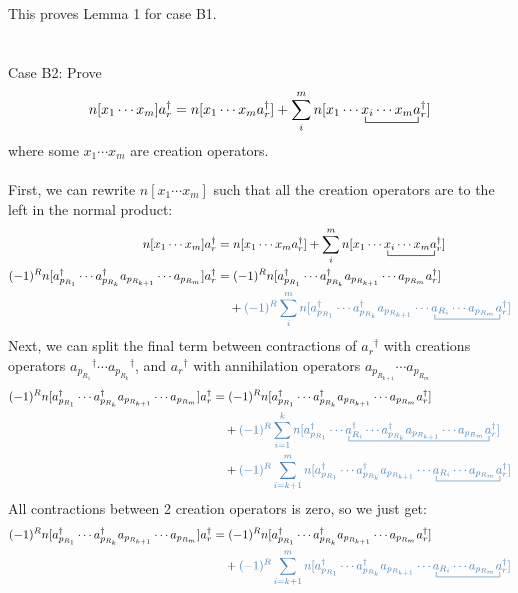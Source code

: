 \documentclass{article}
\newcommand{\ctr}{\bcontraction}
\newcommand{\dg}{\ensuremath{^\dagger} }
\newcommand{\cd}{\ensuremath{\cdots} }
\def\cb#1{{\color{blue}#1}}
\begin{document}
This proves Lemma 1 for case B1. 
\\ \\  \\ 
Case B2: Prove 
\[n[x_1 \cd x_m]a_r\dg = n[x_1 \cd x_m a_r\dg] + \sum_i^m n[\ctr{x_1 \cd}{x}{{}_i \cd x_m}{x} x_1 \cd x_i \cd x_m a_r\dg]\]
where some $x_1 \cd x_m$ are creation operators. \\ \\
First, we can rewrite $n[x_1 \cd x_m]$ such that all the creation operators are to the left in the normal product:
\begin{align*}
n[x_1 \cd x_m]a_r\dg &= n[x_1 \cd x_m a_r\dg] + \sum_i^m n[\ctr{x_1 \cd}{x}{{}_i \cd x_m}{x} x_1 \cd x_i \cd x_m a_r\dg] \\ 
(-1)^R n[a_{p_{R_1}}\dg \cd a_{p_{R_k}}\dg a_{p_{R_{k+1}}} \cd a_{p_{R_m}}] a_r\dg &= 
(-1)^R n[a_{p_{R_1}}\dg \cd a_{p_{R_k}}\dg a_{p_{R_{k+1}}} \cd a_{p_{R_m}} a_r\dg ]   \\
&\quad+ \cb{(-1)^R  \sum_i^m  n[\ctr{ a_{p_{R_1}}\dg \cd a_{p_{R_k}}\dg a_{p_{R_{k+1}}} \cd}{a}{{}_{R_i}\cd a_{p_{R_m}} }{a} a_{p_{R_1}}\dg \cd a_{p_{R_k}}\dg a_{p_{R_{k+1}}} \cd a_{R_i}\cd a_{p_{R_m}} a_r\dg ] }\\
\end{align*}
Next, we can split the final term between contractions of $a_r\dg$ with creations operators $a_{p_{R_1}}\dg \cd a_{p_{R_k}}\dg $, and $a_r\dg$ with annihilation operators $a_{p_{R_{k+1}}} \cd a_{p_{R_m}}$
\begin{align*}
(-1)^R n[a_{p_{R_1}}\dg \cd a_{p_{R_k}}\dg a_{p_{R_{k+1}}} \cd a_{p_{R_m}}] a_r\dg
&= (-1)^R n[a_{p_{R_1}}\dg \cd a_{p_{R_k}}\dg a_{p_{R_{k+1}}} \cd a_{p_{R_m}} a_r\dg ]   \\
&\quad+ \cb{(-1)^R  \sum_{i=1}^k  n[\ctr{ a_{p_{R_1}}\dg \cd}{a}{{}_{R_i}\dg \cd a_{p_{R_k}}\dg a_{p_{R_{k+1}}} \cd a_{p_{R_m}}}{a} a_{p_{R_1}}\dg \cd a_{R_i}\dg \cd a_{p_{R_k}}\dg a_{p_{R_{k+1}}} \cd a_{p_{R_m}} a_r\dg ]} \\
&\quad+ \cb{(-1)^R  \sum_{i=k+1}^m  n[\ctr{ a_{p_{R_1}}\dg \cd a_{p_{R_k}}\dg a_{p_{R_{k+1}}} \cd}{a}{{}_{R_i}\cd a_{p_{R_m}} }{a} a_{p_{R_1}}\dg \cd a_{p_{R_k}}\dg a_{p_{R_{k+1}}} \cd a_{R_i}\cd a_{p_{R_m}} a_r\dg ] }\\
\end{align*}
All contractions between 2 creation operators is zero, so we just get: 
\begin{align*}
(-1)^R n[a_{p_{R_1}}\dg \cd a_{p_{R_k}}\dg a_{p_{R_{k+1}}} \cd a_{p_{R_m}}] a_r\dg
&= (-1)^R n[a_{p_{R_1}}\dg \cd a_{p_{R_k}}\dg a_{p_{R_{k+1}}} \cd a_{p_{R_m}} a_r\dg ]   \\
&\quad+ \cb{(-1)^R  \sum_{i=k+1}^m  n[\ctr{ a_{p_{R_1}}\dg \cd a_{p_{R_k}}\dg a_{p_{R_{k+1}}} \cd}{a}{{}_{R_i}\cd a_{p_{R_m}} }{a} a_{p_{R_1}}\dg \cd a_{p_{R_k}}\dg a_{p_{R_{k+1}}} \cd a_{R_i}\cd a_{p_{R_m}} a_r\dg ] }\\
\end{align*}
\end{document}
